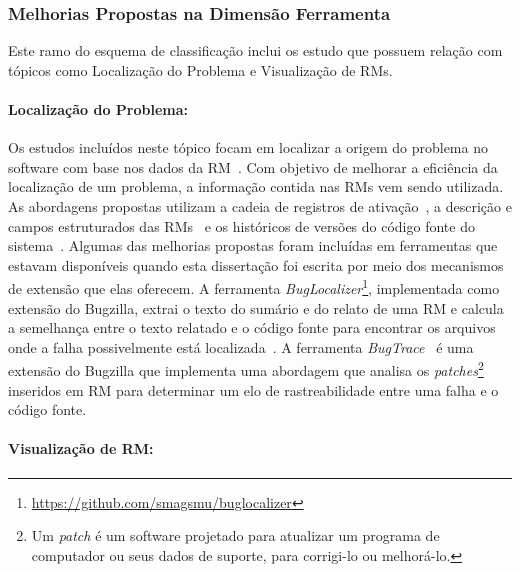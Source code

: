 

\subsubsection{Melhorias Propostas na Dimensão Ferramenta}\label{ssub:melhorias_dim_ferramenta}

Este ramo do esquema de classificação inclui os estudo que possuem relação com
tópicos como Localização do Problema e Visualização de RMs.

\paragraph{Localização do Problema:}

Os estudos incluídos neste tópico focam em localizar a origem do problema no
software com base nos dados da RM~\cite{Hovemeyer:2004:FBE:1052883.1052895}.
Com objetivo de melhorar a eficiência da localização de um problema, a
informação contida nas RMs vem sendo utilizada. As abordagens propostas
utilizam a cadeia de registros de
ativação~\cite{Wong:2014:BBF:2705615.2706096}, a des\-cri\-ção e campos
estruturados das RMs~\cite{Thung:2014:BIT:2635868.2661678} e os históricos de
versões do código fonte do
sistema~\cite{Bangcharoensap:2012:LSC:2419061.2419428, corley2011recovering,
    Romo:2015:TAT:2745802.2745833}. Algumas das melhorias propostas foram
incluídas em ferramentas que estavam disponíveis quando esta dissertação foi
escrita por meio dos mecanismos de extensão que elas oferecem. A ferramenta
\textit{BugLocalizer}\footnote{\url{https://github.com/smagsmu/buglocalizer}},
implementada como extensão do Bugzilla, extrai o texto do sumário e do relato
de uma RM e calcula a semelhança entre o texto relatado e o código fonte para
encontrar os arquivos onde a falha possivelmente está
localizada~\cite{Thung:2014:BIT:2635868.2661678}. A ferramenta
\textit{BugTrace}~\cite{corley2011recovering} é uma extensão do Bugzilla que
implementa uma abordagem que analisa os \textit{patches}\footnote{Um
    \textit{patch} é um software projetado para atualizar um programa de
    computador ou seus dados de suporte, para corrigi-lo ou melhorá-lo.}
inseridos em RM para determinar um elo de rastreabilidade entre uma falha e o
código fonte.

\paragraph{Visualização de RM:}

